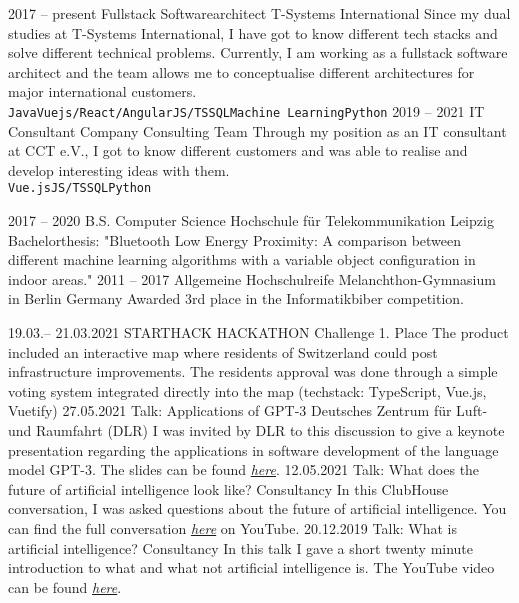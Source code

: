 \documentclass[9pt]{cvstyle}
\begin{document}

\begin{entrylist}
	\entry
		{2017 -- present}
		{Fullstack Softwarearchitect}
		{T-Systems International}
		{
			Since my dual studies at T-Systems International, I have got to know different tech stacks and solve different
			technical problems. Currently, I am working as a fullstack software architect and the team allows me to
			conceptualise different architectures for major international customers.\\
			\texttt{Java}\slashsep\texttt{Vuejs/React/Angular}\slashsep\texttt{JS/TS}\slashsep\texttt{SQL}\slashsep\texttt{Machine Learning}\slashsep\texttt{Python}
		}
	\entry
		{2019 -- 2021}
		{IT Consultant}
		{Company Consulting Team}
		{
			Through my position as an IT consultant at CCT e.V., I got to know different customers and was able to realise
			and develop interesting ideas with them.\\
			\texttt{Vue.js}\slashsep\texttt{JS/TS}\slashsep\texttt{SQL}\slashsep\texttt{Python}
		}
\end{entrylist}


\begin{entrylist}
	\entry
		{2017 -- 2020}
		{B.S. Computer Science}
		{Hochschule für Telekommunikation Leipzig}
		{Bachelorthesis: "Bluetooth Low Energy Proximity: A comparison between different machine learning algorithms with a variable object configuration in indoor areas."}
	\entry
		{2011 -- 2017}
		{Allgemeine Hochschulreife}
		{Melanchthon-Gymnasium in Berlin Germany}
		{Awarded 3rd place in the Informatikbiber competition.}
\end{entrylist}


\begin{entrylist}
	\entry
		{19.03.-- 21.03.2021}
		{STARTHACK HACKATHON}
		{Challenge 1. Place}
		{The product included an interactive map where residents of Switzerland could post infrastructure improvements. The residents approval was done through a simple voting system integrated directly into the map (techstack: TypeScript, Vue.js, Vuetify)}
	\entry
		{27.05.2021}
		{Talk: Applications of GPT-3}
		{Deutsches Zentrum für Luft- und Raumfahrt (DLR)}
		{I was invited by DLR to this discussion to give a keynote presentation regarding the applications in software development of the language model GPT-3. The slides can be found \emph{\href{https://florianwoelki-dlr-slides.vercel.app}{here}}.}
	\entry
		{12.05.2021}
		{Talk: What does the future of artificial intelligence look like?}
		{Consultancy}
		{In this ClubHouse conversation, I was asked questions about the future of artificial intelligence. You can find the full conversation \emph{\href{https://youtu.be/cZ--7TzyzfM}{here}} on YouTube.}
	\entry
		{20.12.2019}
		{Talk: What is artificial intelligence?}
		{Consultancy}
		{In this talk I gave a short twenty minute introduction to what and what not artificial intelligence is. The YouTube video can be found \emph{\href{https://www.youtube.com/watch?v=m9kapfxwYOA&feature=youtu.be}{here}}.}
\end{entrylist}
\end{document}
